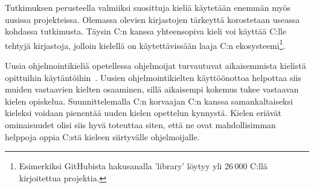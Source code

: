 
Tutkimuksen perusteella valmiiksi suosittuja kieliä käytetään enemmän myös
uusissa projekteissa. Olemassa olevien kirjastojen tärkeyttä korostetaan
useassa kohdassa tutkimusta. Täysin C:n kanssa yhteensopiva kieli voi käyttää
C:lle tehtyjä kirjastoja, jolloin kielellä on käytettävissään laaja C:n
ekosysteemi\footnote{Esimerkiksi GitHubista hakusanalla 'library' löytyy yli
26\,000 C:llä kirjoitettua projektia.}.

Uusia ohjelmointikieliä opetellessa ohjelmoijat turvautuvat aikaisemmista
kielistä opittuihin käytäntöihin~\citep{languagelearning}. Uusien
ohjelmointikielten käyttöönottoa helpottaa siis muiden vastaavien kielten
osaaminen, sillä aikaisempi kokemus tukee vastaavan kielen opiskelua.
Suunnittelemalla C:n korvaajan C:n kanssa samankaltaiseksi kieleksi voidaan
pienentää uuden kielen opettelun kynnystä. Kielen eriävät ominaisuudet olisi
siis hyvä toteuttaa siten, että ne ovat mahdollisimman helppoja oppia C:stä
kieleen siirtyvälle ohjelmoijalle.


